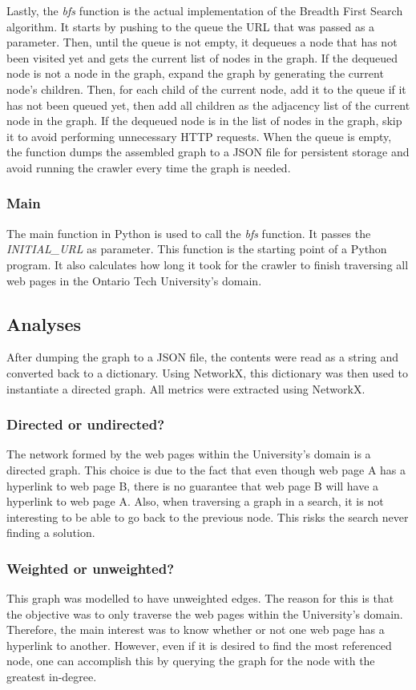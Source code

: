 Lastly, the \textit{bfs} function is the actual implementation of the Breadth First Search algorithm. It starts by pushing to the queue the URL that was passed as a parameter. Then, until the queue is not empty, it dequeues a node that has not been visited yet and gets the current list of nodes in the graph. If the dequeued node is not a node in the graph, expand the graph by generating the current node's children. Then, for each child of the current node, add it to the queue if it has not been queued yet, then add all children as the adjacency list of the current node in the graph. If the dequeued node is in the list of nodes in the graph, skip it to avoid performing unnecessary HTTP requests. When the queue is empty, the function dumps the assembled graph to a JSON file for persistent storage and avoid running the crawler every time the graph is needed.

\subsubsection{Main}
The main function in Python is used to call the \textit{bfs} function. It passes the \textit{INITIAL\_URL} as parameter. This function is the starting point of a Python program. It also calculates how long it took for the crawler to finish traversing all web pages in the Ontario Tech University's domain.

\subsection{Analyses}
After dumping the graph to a JSON file, the contents were read as a string and converted back to a dictionary. Using NetworkX, this dictionary was then used to instantiate a directed graph. All metrics were extracted using NetworkX.

\subsubsection{Directed or undirected?} The network formed by the web pages within the University's domain is a directed graph. This choice is due to the fact that even though web page A has a hyperlink to web page B, there is no guarantee that web page B will have a hyperlink to web page A. Also, when traversing a graph in a search, it is not interesting to be able to go back to the previous node. This risks the search never finding a solution.

\subsubsection{Weighted or unweighted?} This graph was modelled to have unweighted edges. The reason for this is that the objective was to only traverse the web pages within the University's domain. Therefore, the main interest was to know whether or not one web page has a hyperlink to another. However, even if it is desired to find the most referenced node, one can accomplish this by querying the graph for the node with the greatest in-degree.

